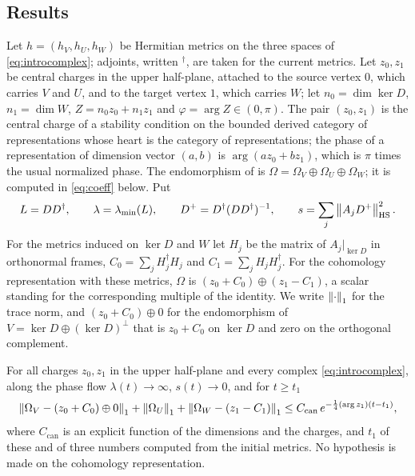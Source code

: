 \subsection{Results}
Let $h=(h_V,h_U,h_W)$ be Hermitian metrics on the three spaces of
\eqref{eq:introcomplex}; adjoints, written ${}^\dagger$, are taken for the
current metrics. Let $z_0,z_1$ be central charges in the upper half-plane,
attached to the source vertex $0$, which carries $V$ and $U$, and to the
target vertex $1$, which carries $W$; let $n_0=\dim\ker D$, $n_1=\dim W$,
$Z=n_0z_0+n_1z_1$ and $\varphi=\arg Z\in(0,\pi)$. The pair $(z_0,z_1)$ is the
central charge of a stability condition on the bounded derived category of
representations whose heart is the category of representations; the phase of
a representation of dimension vector $(a,b)$ is $\arg(az_0+bz_1)$, which is
$\pi$ times the usual normalized phase. The endomorphism of
\cite[\S5.4]{hkkp26} is $\Omega=\Omega_V\oplus\Omega_U\oplus\Omega_W$; it is
computed in \eqref{eq:coeff} below. Put
\[
 L=DD^\dagger,\qquad\lambda=\lambda_{\min}(L),\qquad
 D^+=D^\dagger(DD^\dagger)^{-1},\qquad s=\sum_j\left\lVert A_jD^+\right\rVert_{\mathrm{HS}}^2 .
\]
For the metrics induced on $\ker D$ and $W$ let $H_j$ be the matrix of
$A_j|_{\ker D}$ in orthonormal frames, $C_0=\sum_jH_j^\dagger H_j$ and
$C_1=\sum_jH_jH_j^\dagger$. For the cohomology representation with these
metrics, $\Omega$ is $(z_0+C_0)\oplus(z_1-C_1)$, a scalar standing for the
corresponding multiple of the identity. We write $\left\lVert\cdot\right\rVert_1$ for
the trace norm, and $(z_0+C_0)\oplus0$ for the endomorphism of
$V=\ker D\oplus(\ker D)^\perp$ that is $z_0+C_0$ on $\ker D$ and zero on the
orthogonal complement.

\begin{theorem}\label{thm:introA}
For all charges $z_0,z_1$ in the upper half-plane and every complex
\eqref{eq:introcomplex}, along the phase flow $\lambda(t)\to\infty$,
$s(t)\to0$, and for $t\geq t_1$
\[
 \left\lVert\Omega_V-(z_0+C_0)\oplus0\right\rVert_1+\left\lVert\Omega_U\right\rVert_1+\left\lVert\Omega_W-(z_1-C_1)\right\rVert_1
 \leq C_{\mathrm{can}}\,e^{-\frac14(\arg z_1)(t-t_1)},
\]
where $C_{\mathrm{can}}$ is an explicit function of the dimensions and the
charges, and $t_1$ of these and of three numbers computed from the initial
metrics. No hypothesis is made on the cohomology representation.
\end{theorem}

